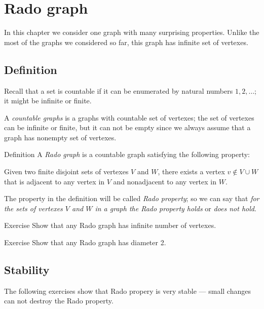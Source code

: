 \chapter{Rado graph}

In this chapter we consider one graph with many surprising properties.
Unlike the most of the graphs we considered so far, this graph has infinite set of vertexes.

\section*{Definition}

Recall that a set is countable if it can be enumerated by natural numbers $1,2,\dots$;
it might be infinite or finite.

A \emph{countable graphs} is a graphs with countable set of vertexes;
the set of vertexes can be infinite or finite, but it can not be empty since we always assume that a graph has nonempty set of vertexes.


\begin{thm}{Definition}
A \emph{Rado graph} is a countable graph satisfying the following property:

Given two finite disjoint sets of vertexes $V$ and $W$, there exists a
vertex $v\notin V\cup W$ that is adjacent to any vertex in $V$ and nonadjacent to any vertex in $W$.
\end{thm}

The property in the definition will be called \emph{Rado property}; so we can say that \emph{for the sets of vertexes $V$ and $W$ in a graph the Rado property holds} or \emph{does not hold}.

\begin{thm}{Exercise}
Show that any Rado graph has infinite number of vertexes. 
\end{thm}

\begin{thm}{Exercise}
Show that any Rado graph has diameter 2.
\end{thm}

\section*{Stability}

The following exercises show that Rado propery is very stable --- 
small changes can not destroy the Rado property.


